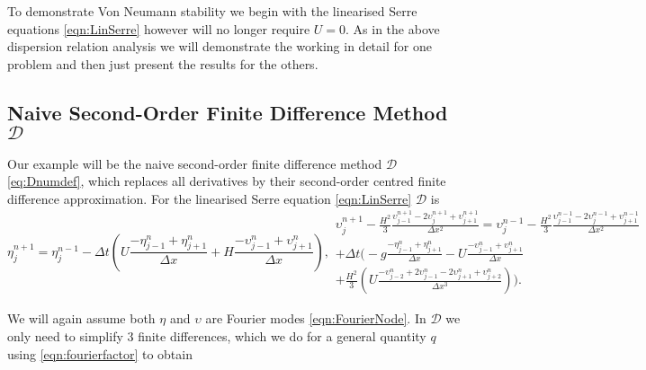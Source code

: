 To demonstrate Von Neumann stability we begin with the linearised Serre equations \eqref{eqn:LinSerre} however will no longer require $U=0$. As in the above dispersion relation analysis we will demonstrate the working in detail for one problem and then just present the results for the others. 

\subsection{Naive Second-Order Finite Difference Method $\mathcal{D}$ }
Our example will be the naive second-order finite difference method $\mathcal{D}$ \eqref{eq:Dnumdef}, which replaces all derivatives by their second-order centred finite difference approximation. For the linearised Serre equation \eqref{eqn:LinSerre} $\mathcal{D}$ is
\begin{subequations}
\begin{equation}
\eta^{n+1}_j = \eta^{n-1}_j - \Delta t \left(U \frac{- \eta^{n}_{j-1} + \eta^{n}_{j+1} }{\Delta x} + H \frac{- \upsilon^{n}_{j-1} + \upsilon^{n}_{j+1}}{\Delta x}\right),
\end{equation}
\begin{multline}
\upsilon^{n+1}_j - \frac{H^2}{3}\frac{\upsilon^{n+1}_{j-1} -2\upsilon^{n+1}_{j} +\upsilon^{n+1}_{j+1} }{\Delta x^2} 
 =  \upsilon^{n-1}_j - \frac{H^2}{3}\frac{\upsilon^{n-1}_{j-1} -2\upsilon^{n-1}_{j} +\upsilon^{n-1}_{j+1}}{\Delta x^2}   \\+  \Delta t\Bigg(- g\frac{-\eta^n_{j-1} + \eta^n_{j+1} }{\Delta x}   - U\frac{-\upsilon^n_{j-1} + \upsilon^n_{j+1} }{\Delta x}\\ + \frac{H^2}{3}\left(U \frac{-\upsilon^{n}_{j-2} +2\upsilon^{n}_{j-1} -2\upsilon^{n}_{j+1} +\upsilon^{n}_{j+2}}{\Delta x^3}  \right)\Bigg). 
\end{multline}
\label{eqn:DmethforlinSerre}
\end{subequations}


We will again assume both $\eta$ and $\upsilon$ are Fourier modes \eqref{eqn:FourierNode}. In $\mathcal{D}$ we only need to simplify 3 finite differences, which we do for a general quantity $q$ using \eqref{eqn:fourierfactor} to obtain

